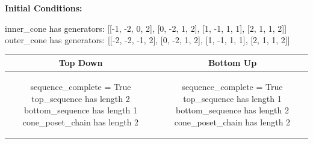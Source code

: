 \documentclass[10pt]{article}
\begin{document}
\textbf{Initial Conditions:}
\begin{SAGE}
inner_cone has generators: 
[[-1, -2, 0, 2], [0, -2, 1, 2], [1, -1, 1, 1], [2, 1, 1, 2]]
outer_cone has generators: 
[[-2, -2, -1, 2], [0, -2, 1, 2], [1, -1, 1, 1], [2, 1, 1, 2]]

\end{SAGE}
\begin{tabular}{c|c}
\textbf{Top Down} & \textbf{Bottom Up} \\ \hline  
\begin{SAGE}
sequence_complete = True
top_sequence has length 2
bottom_sequence has length 1
cone_poset_chain has length 2
\end{SAGE} 
&
\begin{SAGE}
sequence_complete = True
top_sequence has length 1
bottom_sequence has length 2
cone_poset_chain has length 2
\end{SAGE} 
\\ \hline


\end{tabular}
\end{document}
